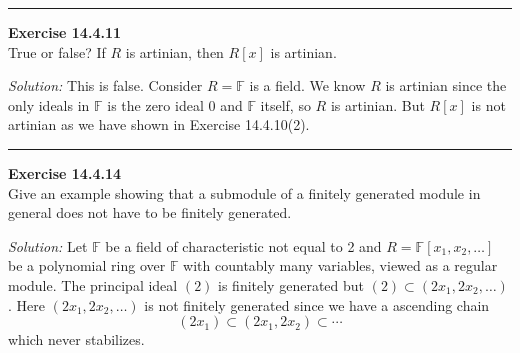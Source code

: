 \documentclass[a4paper, 12pt]{article}
\newenvironment{problem}[2][Exercise]
    { \begin{mdframed}[backgroundcolor=gray!20] \textbf{#1 #2} \\}
    {  \end{mdframed}}
\newenvironment{solution}
    {\textit{Solution:}}
    {}
\begin{document}
\noindent\rule{7in}{2.8pt}
\begin{problem}{14.4.11}
True or false? If \(R\) is artinian, then \(R[x]\) is artinian.
\end{problem}
\begin{solution}
This is false. Consider \(R=\mathbb{F}\) is a field. We know \(R\) is artinian since the only ideals in \(\mathbb{F}\) is the zero ideal \(0\) and \(\mathbb{F}\) itself, so \(R\) is artinian. But \(R[x]\) is not artinian as we have shown in 
Exercise 14.4.10(2). 
\end{solution}

\noindent\rule{7in}{2.8pt}
\begin{problem}{14.4.14}
Give an example showing that a submodule of a finitely generated module in general does not have to be finitely generated.
\end{problem}
\begin{solution}
Let \(\mathbb{F}\) be a field of characteristic not equal to 2 and \(R=\mathbb{F}[x_1,x_2,\ldots]\) be a polynomial ring over \(\mathbb{F}\) with countably many variables, viewed as a regular module. The principal ideal \((2)\) is finitely generated but 
\((2)\subset (2x_1,2x_2,\ldots)\). Here \((2x_1,2x_2,\ldots)\) is not finitely generated since we have a ascending chain 
\[(2x_1)\subset (2x_1,2x_2)\subset \cdots\]
which never stabilizes.  
\end{solution}
\end{document}

